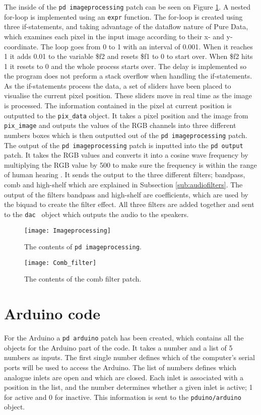 The inside of the \texttt{pd imageprocessing} patch can be seen on Figure \ref{Fig:Imageprocessing}. A nested for-loop is implemented using an \texttt{expr} function. The for-loop is created using three if-statements, and taking advantage of the dataflow nature of Pure Data, which examines each pixel in the input image according to their x- and y-coordinate.
The loop goes from 0 to 1 with an interval of 0.001. When it reaches 1 it adds 0.01 to the variable \$f2 and resets \$f1 to 0 to start over. When \$f2 hits 1 it resets to 0 and the whole process starts over. The delay is implemented so the program does not preform a stack overflow when handling the if-statements. 
As the if-statements process the data, a set of sliders have been placed to visualise the current pixel position. These sliders move in real time as the image is processed. The information contained in the pixel at current position is outputted to the \texttt{pix\_data} object. It takes a pixel position and the image from \texttt{pix\_image} and outputs the values of the RGB channels into three different numbers boxes which is then outputted out of the \texttt{pd imageprocessing} patch. The output of the \texttt{pd imageprocessing} patch is inputted into the \texttt{pd output} patch. It takes the RGB values and converts it into a cosine wave frequency by multiplying the RGB value by 500 to make sure the frequency is within the range of human hearing \cite{steiglitz1997digital}. It sends the output to the three different filters; bandpass, comb and high-shelf which are explained in Subsection \ref{sub:audiofilters}. The output of the filters bandpass and high-shelf are coefficients, which are used by the biquad to create the filter effect. All three filters are added together and sent to the \texttt{dac~} object which outputs the audio to the speakers. 

\begin{figure}
\centering
\texttt{[image: Imageprocessing]}
\caption{The contents of \texttt{pd imageprocessing}.}
\label{Fig:Imageprocessing}
\end{figure}

\begin{figure}
\centering
\texttt{[image: Comb\_filter]}
\caption{The contents of the comb filter patch.}
\label{Fig:Comb_filter}
\end{figure}

\section{Arduino code}
For the Arduino a \texttt{pd arduino} patch has been created, which contains all the objects for the Arduino part of the code. It takes a number and a list of 5 numbers as inputs. The first single number defines which of the computer's serial ports will be used to access the Arduino. The list of numbers defines which analogue inlets are open and which are closed. Each inlet is associated with a position in the list, and the number determines whether a given inlet is active; 1 for active and 0 for inactive. This information is sent to the \texttt{pduino/arduino} object.

